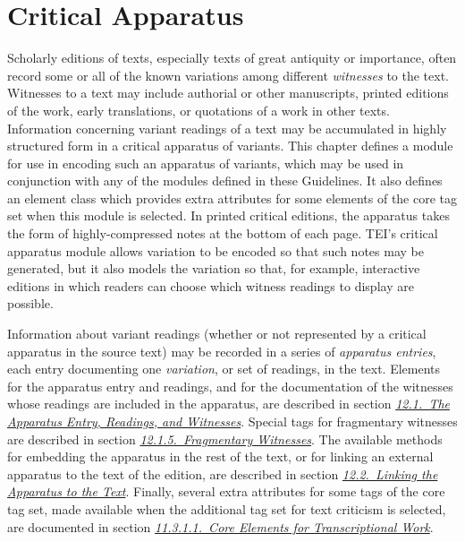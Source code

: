
\section[{Critical Apparatus}]{Critical Apparatus}\label{TC}\par
Scholarly editions of texts, especially texts of great antiquity or importance, often record some or all of the known variations among different \textit{witnesses} to the text. Witnesses to a text may include authorial or other manuscripts, printed editions of the work, early translations, or quotations of a work in other texts. Information concerning variant readings of a text may be accumulated in highly structured form in a critical apparatus of variants. This chapter defines a module for use in encoding such an apparatus of variants, which may be used in conjunction with any of the modules defined in these Guidelines. It also defines an element class which provides extra attributes for some elements of the core tag set when this module is selected. In printed critical editions, the apparatus takes the form of highly-compressed notes at the bottom of each page. TEI’s critical apparatus module allows variation to be encoded so that such notes may be generated, but it also models the variation so that, for example, interactive editions in which readers can choose which witness readings to display are possible.\par
Information about variant readings (whether or not represented by a critical apparatus in the source text) may be recorded in a series of \textit{apparatus entries}, each entry documenting one \textit{variation}, or set of readings, in the text. Elements for the apparatus entry and readings, and for the documentation of the witnesses whose readings are included in the apparatus, are described in section \textit{\hyperref[TCAPLL]{12.1.\ The Apparatus Entry, Readings, and Witnesses}}. Special tags for fragmentary witnesses are described in section \textit{\hyperref[TCAPMI]{12.1.5.\ Fragmentary Witnesses}}. The available methods for embedding the apparatus in the rest of the text, or for linking an external apparatus to the text of the edition, are described in section \textit{\hyperref[TCAPLK]{12.2.\ Linking the Apparatus to the Text}}. Finally, several extra attributes for some tags of the core tag set, made available when the additional tag set for text criticism is selected, are documented in section \textit{\hyperref[PHCO]{11.3.1.1.\ Core Elements for Transcriptional Work}}.\par
